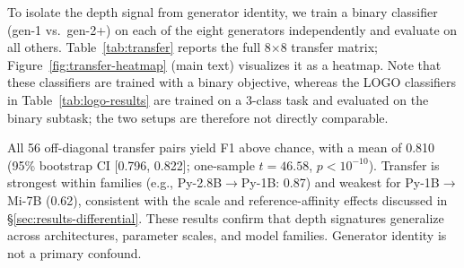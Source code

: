 To isolate the depth signal from generator identity, we train a binary classifier (gen-1 vs.\ gen-2+) on each of the eight generators independently and evaluate on all others.
Table~\ref{tab:transfer} reports the full 8$\times$8 transfer matrix; Figure~\ref{fig:transfer-heatmap} (main text) visualizes it as a heatmap.
Note that these classifiers are trained with a binary objective, whereas the LOGO classifiers in Table~\ref{tab:logo-results} are trained on a 3-class task and evaluated on the binary subtask; the two setups are therefore not directly comparable.

\begin{table}[ht]
\centering
\scriptsize
\setlength{\tabcolsep}{3pt}
\caption{Cross-generator binary F1 transfer matrix (gen-1 vs.\ gen-2+). Each row trains on one generator; each column evaluates on another. Diagonal entries (\underline{underlined}) are within-generator. All 56 off-diagonal pairs exceed chance (0.5). Classifiers use the same 7-feature XGBoost configuration as LOGO but are trained with a binary objective.}
\label{tab:transfer}
\end{table}

All 56 off-diagonal transfer pairs yield F1 above chance, with a mean of 0.810 (95\% bootstrap CI [0.796, 0.822]; one-sample $t=46.58$, $p < 10^{-10}$).
Transfer is strongest within families (e.g., Py-2.8B$\to$Py-1B: 0.87) and weakest for Py-1B$\to$Mi-7B (0.62), consistent with the scale and reference-affinity effects discussed in \S\ref{sec:results-differential}.
These results confirm that depth signatures generalize across architectures, parameter scales, and model families. Generator identity is not a primary confound.
